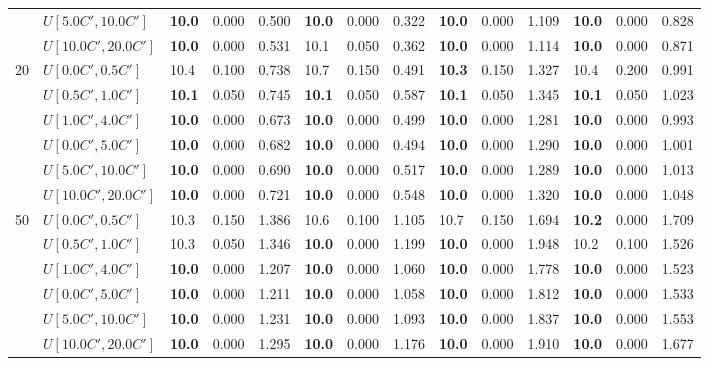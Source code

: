 \begin{table}[h]
{\begin{tabular}{|l|l||l|l|l||l|l|l||l|l|l||l|l|l|}
       & $U[5.0C',10.0C']$ & \textbf{10.0} & 0.000 & 0.500 & \textbf{10.0} & 0.000 & 0.322 & \textbf{10.0} & 0.000 & 1.109 & \textbf{10.0} & 0.000 & 0.828 \\
       & $U[10.0C',20.0C']$ & \textbf{10.0} & 0.000 & 0.531 & 10.1 & 0.050 & 0.362 & \textbf{10.0} & 0.000 & 1.114 & \textbf{10.0} & 0.000 & 0.871 \\
      \hline\hline
      \multirow{6}{*}{20} & $U[0.0C',0.5C']$ & 10.4 & 0.100 & 0.738 & 10.7 & 0.150 & 0.491 & \textbf{10.3} & 0.150 & 1.327 & 10.4 & 0.200 & 0.991 \\
       & $U[0.5C',1.0C']$ & \textbf{10.1} & 0.050 & 0.745 & \textbf{10.1} & 0.050 & 0.587 & \textbf{10.1} & 0.050 & 1.345 & \textbf{10.1} & 0.050 & 1.023 \\
       & $U[1.0C',4.0C']$ & \textbf{10.0} & 0.000 & 0.673 & \textbf{10.0} & 0.000 & 0.499 & \textbf{10.0} & 0.000 & 1.281 & \textbf{10.0} & 0.000 & 0.993 \\
       & $U[0.0C',5.0C']$ & \textbf{10.0} & 0.000 & 0.682 & \textbf{10.0} & 0.000 & 0.494 & \textbf{10.0} & 0.000 & 1.290 & \textbf{10.0} & 0.000 & 1.001 \\
       & $U[5.0C',10.0C']$ & \textbf{10.0} & 0.000 & 0.690 & \textbf{10.0} & 0.000 & 0.517 & \textbf{10.0} & 0.000 & 1.289 & \textbf{10.0} & 0.000 & 1.013 \\
       & $U[10.0C',20.0C']$ & \textbf{10.0} & 0.000 & 0.721 & \textbf{10.0} & 0.000 & 0.548 & \textbf{10.0} & 0.000 & 1.320 & \textbf{10.0} & 0.000 & 1.048 \\
      \hline\hline
      \multirow{6}{*}{50} & $U[0.0C',0.5C']$ & 10.3 & 0.150 & 1.386 & 10.6 & 0.100 & 1.105 & 10.7 & 0.150 & 1.694 & \textbf{10.2} & 0.000 & 1.709 \\
       & $U[0.5C',1.0C']$ & 10.3 & 0.050 & 1.346 & \textbf{10.0} & 0.000 & 1.199 & \textbf{10.0} & 0.000 & 1.948 & 10.2 & 0.100 & 1.526 \\
       & $U[1.0C',4.0C']$ & \textbf{10.0} & 0.000 & 1.207 & \textbf{10.0} & 0.000 & 1.060 & \textbf{10.0} & 0.000 & 1.778 & \textbf{10.0} & 0.000 & 1.523 \\
       & $U[0.0C',5.0C']$ & \textbf{10.0} & 0.000 & 1.211 & \textbf{10.0} & 0.000 & 1.058 & \textbf{10.0} & 0.000 & 1.812 & \textbf{10.0} & 0.000 & 1.533 \\
       & $U[5.0C',10.0C']$ & \textbf{10.0} & 0.000 & 1.231 & \textbf{10.0} & 0.000 & 1.093 & \textbf{10.0} & 0.000 & 1.837 & \textbf{10.0} & 0.000 & 1.553 \\
       & $U[10.0C',20.0C']$ & \textbf{10.0} & 0.000 & 1.295 & \textbf{10.0} & 0.000 & 1.176 & \textbf{10.0} & 0.000 & 1.910 & \textbf{10.0} & 0.000 & 1.677 \\
      \hline
      \end{tabular}
      }
      \label{tab:pcpn90p7ILPVariant}\end{table}
      
